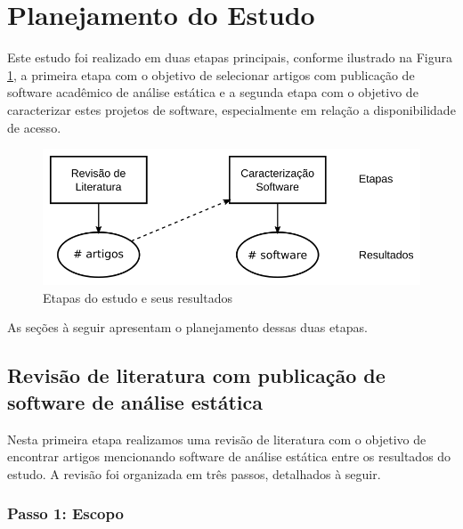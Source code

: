 
\section{Planejamento do Estudo} \label{estudo1:planejamento} %

Este estudo foi realizado em duas etapas principais, conforme ilustrado na
Figura \ref{estudo1-etapas}, a primeira etapa com o objetivo de selecionar
artigos com publicação de software acadêmico de análise estática e a segunda
etapa com o objetivo de caracterizar estes projetos de software, especialmente
em relação a disponibilidade de acesso.

\begin{figure}[h]
  \center
  \includegraphics[scale=0.4]{imagens/estudo1-etapas.png}
  \caption{Etapas do estudo e seus resultados}
  \label{estudo1-etapas}
\end{figure}

As seções à seguir apresentam o planejamento dessas duas etapas.

\subsection{Revisão de literatura com publicação de software de análise estática}

Nesta primeira etapa realizamos uma revisão de literatura com o objetivo de
encontrar artigos mencionando software de análise estática entre os resultados
do estudo. A revisão foi organizada em três passos, detalhados à seguir.


\subsubsection{Passo 1: Escopo}

